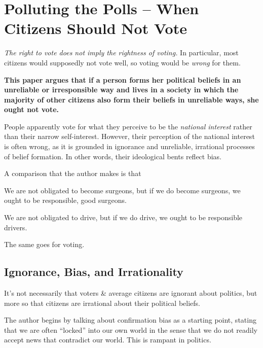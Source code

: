 \documentclass[letterpaper]{article}
\begin{document}
\section{Polluting the Polls -- When Citizens Should Not Vote}
\emph{The right to vote does not imply the rightness of voting.} In particular, most citizens would supposedly not vote well, so voting would be \emph{wrong} for them.

\bigskip 

\textbf{This paper argues that if a person forms her political beliefs in an unreliable or irresponsible way and lives in a society in which the majority of other citizens also form their beliefs in unreliable ways, she ought not vote.}

\bigskip 

People apparently vote for what they perceive to be the \emph{national interest} rather than their narrow self-interest. However, their perception of the national interest is often wrong, as it is grounded in ignorance and unreliable, irrational processes of belief formation. In other words, their ideological bents reflect bias.

\bigskip 

A comparison that the author makes is that
\begin{mdframed}[]
    We are not obligated to become surgeons, but if we do become surgeons, we ought to be responsible, good surgeons.

    \bigskip 

    We are not obligated to drive, but if we do drive, we ought to be responsible drivers. 

    \bigskip

    The same goes for voting. 
\end{mdframed}


\subsection{Ignorance, Bias, and Irrationality}
It's not necessarily that voters \& average citizens are ignorant about politics, but more so that citizens are irrational about their political beliefs. 

\bigskip 

The author begins by talking about confirmation bias as a starting point, stating that we are often ``locked'' into our own world in the sense that we do not readily accept news that contradict our world. This is rampant in politics. 

\bigskip 
\end{document}
